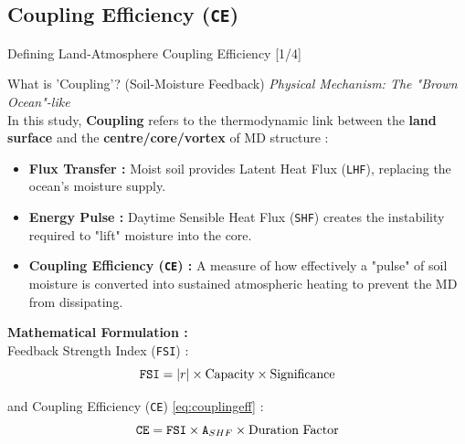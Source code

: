 \documentclass[8pt, aspectratio=169]{beamer}
\begin{document}
\subsection{Coupling Efficiency (\texttt{CE})}
\begin{frame}{Defining Land-Atmosphere Coupling Efficiency [1/4]}
    \begin{block}{What is 'Coupling'? (Soil-Moisture Feedback)}
        \footnotesize
        \textit{Physical Mechanism: The "Brown Ocean"-like} \\
        In this study, \textbf{Coupling} refers to the thermodynamic link between the \textbf{land surface} and the \textbf{centre/core/vortex} of MD structure :
        \begin{itemize}
            \item \textbf{Flux Transfer :} Moist soil provides Latent Heat Flux (\texttt{LHF}), replacing the ocean's moisture supply.
            \item \textbf{Energy Pulse :} Daytime Sensible Heat Flux (\texttt{SHF}) creates the instability required to "lift" moisture into the core.
            \item \textbf{Coupling Efficiency (\texttt{CE}) :} A measure of how effectively a "pulse" of soil moisture is converted into sustained atmospheric heating to prevent the MD from dissipating.
        \end{itemize}
    \end{block}

    \vspace{0.2cm}
    \textbf{Mathematical Formulation :} \\
    Feedback Strength Index (\texttt{FSI}) :
    \begin{equation}
        \text{\texttt{FSI}} = |r| \times \text{Capacity} \times \text{Significance}
    \end{equation}

    and Coupling Efficiency (\texttt{CE}) \ref{eq:couplingeff} :
    \begin{equation}
        \text{\texttt{CE}} = \text{\texttt{FSI}} \times \text{\texttt{A}}_{SHF} \times \text{Duration Factor}
    \end{equation}

    \vfill
    {\let\thefootnote\relax{}}
\end{frame}
\end{document}
